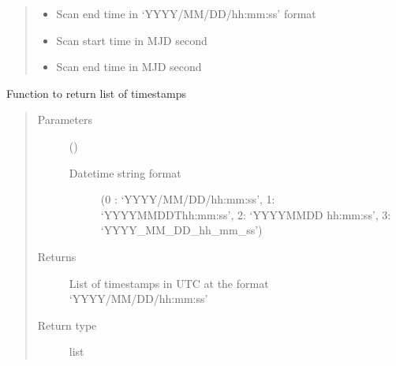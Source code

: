 \documentclass[letterpaper,10pt,english]{sphinxmanual}
\begin{document}
\begin{fulllineitems}
\begin{fulllineitems}
\begin{quote}
\begin{description}
\begin{itemize}
\item {} 
\sphinxAtStartPar
{} \textendash{} Scan end time in ‘YYYY/MM/DD/hh:mm:ss’ format

\item {} 
\sphinxAtStartPar
{} \textendash{} Scan start time in MJD second

\item {} 
\sphinxAtStartPar
{} \textendash{} Scan end time in MJD second

\end{itemize}


\end{description}\end{quote}

\end{fulllineitems}


\begin{fulllineitems}
\label{\detokenize{paircars:paircars.access_ms.AccessMS.get_timestamps}}
\sphinxAtStartPar
Function to return list of timestamps
\begin{quote}\begin{description}
\item[{Parameters}] \leavevmode
\sphinxAtStartPar
{} () \textendash{} \begin{description}
\item[{Datetime string format}] \leavevmode
\sphinxAtStartPar
(0 : ‘YYYY/MM/DD/hh:mm:ss’, 1: ‘YYYY\sphinxhyphen{}MM\sphinxhyphen{}DDThh:mm:ss’, 2: ‘YYYY\sphinxhyphen{}MM\sphinxhyphen{}DD hh:mm:ss’, 3: ‘YYYY\_MM\_DD\_hh\_mm\_ss’)

\end{description}


\item[{Returns}] \leavevmode
\sphinxAtStartPar
List of timestamps in UTC at the format ‘YYYY/MM/DD/hh:mm:ss’

\item[{Return type}] \leavevmode
\sphinxAtStartPar
list

\end{description}\end{quote}


\end{fulllineitems}
\end{fulllineitems}
\end{document}
